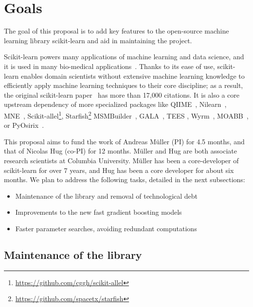 \documentclass[11pt]{article}  %
\begin{document}
\section{Goals}



The goal of this proposal is to add key features to the open-source machine learning library scikit-learn and aid in maintaining the project.

Scikit-learn powers many applications of machine learning and data science,
and it is used in many bio-medical
applications~\cite{roles_of_ml_in_biomed_science,RICHTER201929,
spike_sorting, herg}. Thanks to its ease of use, scikit-learn enables domain scientists without extensive machine learning knowledge to efficiently apply machine learning techniques to their core
discipline; as a result, the original scikit-learn paper~\cite{scikit-learn} has more
than 17,000 citations. It is also a core upstream dependency of more
specialized packages like QIIME~\cite{QIIME2, QIIME2_feature_classifier,
QIIME2_sample_classifier}, Nilearn~\cite{Neuro_imaging_sklearn}, MNE~\cite{MNE},
Scikit-allel\footnote{\href{https://github.com/cggh/scikit-allel}{https://github.com/cggh/scikit-allel}},
Starfish\footnote{\href{https://github.com/spacetx/starfish}{https://github.com/spacetx/starfish}}
MSMBuilder~\cite{MSMBuilder}, GALA~\cite{GALA}, TEES \cite{TEES},
Wyrm~\cite{wyrm}, MOABB~\cite{MOABB}, or PyOsirix~\cite{pyosirix}.

This proposal aims to fund the work of Andreas M\"uller (PI) for 4.5 months,
and that of Nicolas Hug (co-PI) for 12 months. M\"uller and Hug are both
associate research scientists at Columbia University. M\"uller has been a
core-developer of scikit-learn for over 7 years, and Hug has been a core
developer for about six months. We plan to address the following tasks,
detailed in the next subsections:
\begin{itemize}
\item Maintenance of the library and removal of technological debt
\item Improvements to the new fast gradient boosting models
\item Faster parameter searches, avoiding redundant computations
\end{itemize}

\subsection{Maintenance of the library}
\end{document}

